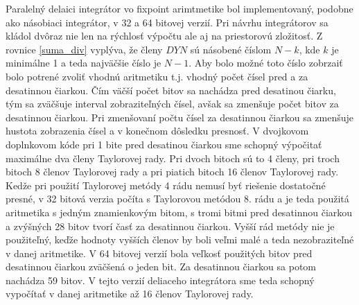 Paralelný delaici integrátor vo fixpoint arimtmetike bol implementovaný, podobne ako násobiaci integrátor, v 32 a 64 bitovej verzií. Pri návrhu integrátorov sa kládol dvôraz nie len na rýchlosť výpočtu ale aj na priestorovú zložitosť. 
Z rovnice \ref{suma_div} vyplýva, že členy $ DYN $ sú násobené číslom $ N-k $, kde $ k $ je minimálne 1 a teda najväčšie číslo je $ N-1 $. Aby bolo možné toto číslo zobrzaiť bolo potrené zvoliť vhodnú aritmetiku t.j. vhodný počet čísel pred a za desatinnou čiarkou. Čím väčší počet bitov sa nachádza pred desatinou čiarku, tým sa zväčšuje interval zobraziteľných čísel, avšak sa zmenšuje počet bitov za desatinnou čiarkou. Pri zmenšovaní počtu čísel za desatinnou čiarkou sa zmenšuje hustota zobrazenia čísel a v konečnom dôsledku presnosť. V dvojkovom doplnkovom kóde pri 1 bite pred desatinou čiarkou sme schopný výpočitať maximálne dva členy Taylorovej rady. Pri dvoch bitoch sú to 4 členy, pri troch bitoch 8 členov Taylorovej rady a pri piatich bitoch 16 členov Taylorovej rady. Kedže pri použití Taylorovej metódy 4 rádu nemusí byť riešenie dostatočné presné, v 32 bitová verzia počíta s Taylorovou metódou 8. rádu a je teda použitá aritmetika s jedným znamienkovým bitom, s tromi bitmi pred desatinnou čiarkou a zvýšných 28 bitov tvorí časť za desatinnou čiarkou. Vyšší rád metódy nie je použiteľný, keďže hodnoty vyšších členov by boli veľmi malé a teda nezobraziteľné v danej aritmetike. 
V 64 bitovej verzií bola veľkosť použitých bitov pred desatinnou čiarkou zväčšená o jeden bit. Za desatinnou čiarkou sa potom nachádza 59 bitov. V tejto verzií deliaceho integrátora sme teda schopný vypočítať v danej aritmetike až 16 členov Taylorovej rady.


